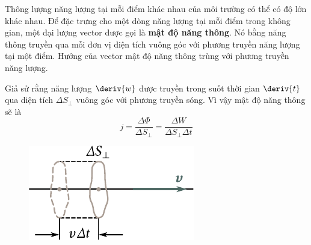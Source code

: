 Thông lượng năng lượng tại mỗi điểm khác nhau của môi trường có thể có độ lớn khác nhau. Để đặc trưng cho một dòng năng lượng tại mỗi điểm trong không gian, một đại lượng vector được gọi là \textbf{mật độ năng thông}. Nó bằng năng thông truyền qua mỗi đơn vị diện tích vuông góc với phương truyền năng lượng tại một điểm. Hướng của vector mật độ năng thông trùng với phương truyền năng lượng.

Giả sử rằng năng lượng $\deriv{w}$ được truyền trong suốt thời gian $\deriv{t}$ qua diện tích $\Delta{S}_{\perp}$ vuông góc với phương truyền sóng. Vì vậy mật độ năng thông sẽ là
\begin{equation}\label{eq:14_45}
	j = \frac{\Delta{\Phi}}{\Delta{S}_{\perp}} = \frac{\Delta{W}}{\Delta{S}_{\perp} \Delta{t}}
\end{equation}

\begin{figure}[!htb]
	\begin{center}
		\includegraphics[scale=1]{figures/ch_14/fig_14_8.pdf}
		\caption[]{}
		\label{fig:14_8}
	\end{center}
	\vspace{-0.9cm}
\end{figure}

